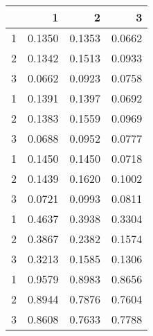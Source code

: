 \begin{tabular}{lrrr}
\toprule
{} &       1 &       2 &       3 \\
\midrule
1 &  0.1350 &  0.1353 &  0.0662 \\
2 &  0.1342 &  0.1513 &  0.0933 \\
3 &  0.0662 &  0.0923 &  0.0758 \\
1 &  0.1391 &  0.1397 &  0.0692 \\
2 &  0.1383 &  0.1559 &  0.0969 \\
3 &  0.0688 &  0.0952 &  0.0777 \\
1 &  0.1450 &  0.1450 &  0.0718 \\
2 &  0.1439 &  0.1620 &  0.1002 \\
3 &  0.0721 &  0.0993 &  0.0811 \\
1 &  0.4637 &  0.3938 &  0.3304 \\
2 &  0.3867 &  0.2382 &  0.1574 \\
3 &  0.3213 &  0.1585 &  0.1306 \\
1 &  0.9579 &  0.8983 &  0.8656 \\
2 &  0.8944 &  0.7876 &  0.7604 \\
3 &  0.8608 &  0.7633 &  0.7788 \\
\bottomrule
\end{tabular}
